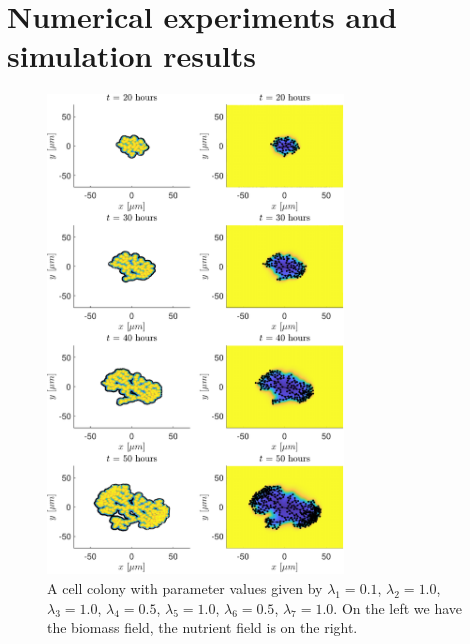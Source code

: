 \chapter{Numerical experiments and simulation results}

\begin{figure}[!htb] %
    \centering
    \includegraphics[width= 0.7\textwidth]{
        chapter2/figures/t_all__L1_0o10_L2_1o00_L3_1o00_L4_0o50_L5_1o00_L6_0o50_L7_1o00.pdf}
    \caption{A cell colony with parameter values given by
             $\lambda_1 = 0.1$,  
             $\lambda_2 = 1.0$, 
             $\lambda_3 = 1.0$, 
             $\lambda_4 = 0.5$, 
             $\lambda_5 = 1.0$, 
             $\lambda_6 = 0.5$, 
             $\lambda_7 = 1.0$. 
             On the left we have the biomass field, the nutrient field is on the right.}
    \label{fig: sdsd}
\end{figure}


\newpage


